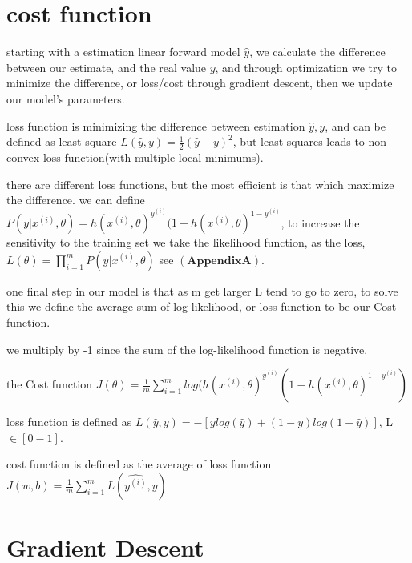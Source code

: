 \documentclass[4apaper,12pt]{book}
\begin{document}
\section{cost function}

\begin{description}
\item starting with a estimation linear forward model $\hat{y}$, we calculate the difference between our estimate, and the real value $y$, and through optimization we try to minimize the difference, or loss/cost through gradient descent, then we update our model's parameters.
  \item loss function is minimizing the difference between estimation ${\hat{y}, y}$, and can be defined as least square $L(\hat{y}, y)=\frac{1}{2}(\hat{y} - y)^2$, but least squares leads to non-convex loss function(with multiple local minimums).
\item there are different loss functions, but the most efficient is that which maximize the difference. we can define $P(y|x^{(i)}, \theta) = h(x^{(i)},\theta)^{y^{(i)}}(1-h(x^{(i)},\theta)^{1-y^{(i)}}$, to increase the sensitivity to the training set we take the likelihood function, as the loss, $L(\theta)=\prod_{i=1}^mP(y|x^{(i)}, \theta)$ see $\mathbf{(AppendixA)}$.
\item one final step in our model is that as m get larger L tend to go to zero, to solve this we define the average sum of log-likelihood, or loss function to be our Cost function.
\item we multiply by -1 since the sum of the log-likelihood function is negative.
\item the Cost function  $J(\theta)=\frac{1}{m}\sum_{i=1}^{m}log(h(x^{(i)},\theta)^{y^{(i)}}(1-h(x^{(i)},\theta)^{1-y^{(i)}})$

\item loss function is defined as $L(\hat{y}, y)=-[ylog(\hat{y}) + (1-y)log(1-\hat{y})]$, L$\in[0-1]$.

\item cost function is defined as the average of loss function $J(w,b)=\frac{1}{m}\sum_{i=1}^{m}L(\hat{y^{(i)}}, y)$
\end{description}

\section{Gradient Descent}
\end{document}
